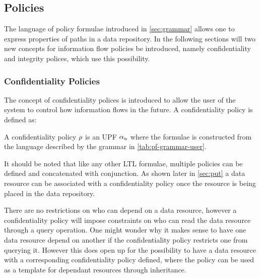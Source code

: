 \subsection{Policies}\label{sec:policies}
The language of policy formulae introduced in \autoref{sec:grammar} allows one to express properties of paths in a data repository. In the following sections will two new concepts for information flow policies be introduced, namely confidentiality and integrity polices, which use this possibility.

\subsubsection{Confidentiality Policies}
The concept of confidentiality polices is introduced to allow the user of the system to control how information flows in the future. A confidentiality policy is defined as:
\begin{definition}\label{def:cp}
A confidentiality policy $\rho$ is an UPF $\alpha_u$ where the formulae is constructed from the language described by the grammar in \autoref{tab:pf-grammar-user}.
\end{definition}
It should be noted that like any other LTL formulae, multiple policies can be defined and concatenated with conjunction. As shown later in \autoref{sec:put} a data resource can be associated with a confidentiality policy once the resource is being placed in the data repository. 

There are no restrictions on who can depend on a data resource, however a confidentiality policy will impose constraints on who can read the data resource through a query operation. One might wonder why it makes sense to have one data resource depend on another if the confidentiality policy restricts one from querying it. However this does open up for the possibility to have a data resource with a corresponding confidentiality policy defined, where the policy can be used as a template for dependant resources through inheritance.


